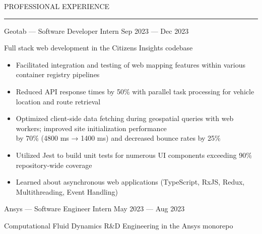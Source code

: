 \documentclass[9pt]{extarticle}
\begin{document}
\vspace{5pt}

\begin{adjustwidth}{4pt}{4pt} PROFESSIONAL EXPERIENCE \end{adjustwidth}
\rule[8pt]{\linewidth}{0.4pt}

\begin{adjustwidth}{14pt}{14pt}
	\vspace{-10pt}

	\textcolor{imptextblack}{Geotab — Software Developer Intern} \hfill Sep 2023 — Dec 2023
	
	Full stack web development in the Citizens Insights codebase
	
	\begin{itemize}[topsep=0pt]
	  	\item Facilitated integration and testing of web mapping features within various container registry pipelines
		\item Reduced API response times by \textcolor{imptextblack}{50\%} with parallel task processing for vehicle location and route retrieval
		\item Optimized client-side data fetching during geospatial queries with web workers; improved site initialization performance \\
			by \textcolor{imptextblack}{70\% (4800 ms → 1400 ms)} and decreased bounce rates by \textcolor{imptextblack}{25\%} 
		\item Utilized Jest to build unit tests for numerous UI components exceeding \textcolor{imptextblack}{90\%} repository-wide coverage
		\item Learned about \textcolor{imptextblack}{asynchronous} web applications (TypeScript, RxJS, Redux, Multithreading, Event Handling)
	\end{itemize}
	
	\vspace{5pt}
	\textcolor{imptextblack}{Ansys — Software Engineer Intern} \hfill May 2023 — Aug 2023
	
	Computational Fluid Dynamics R\&D Engineering in the Ansys monorepo
	

\end{adjustwidth}
\end{document}
